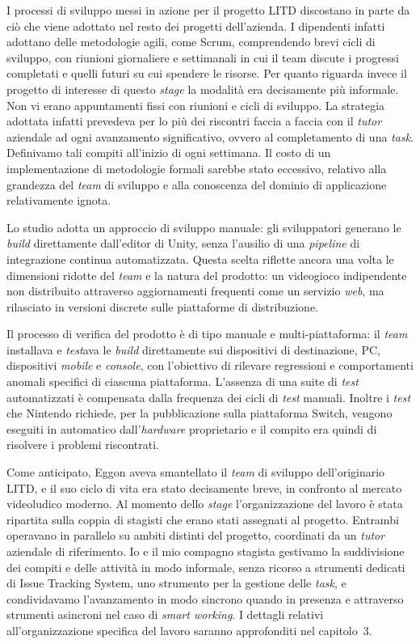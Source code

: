 I processi di sviluppo messi in azione per il progetto LITD discostano in parte da ciò che viene adottato nel resto dei progetti dell'azienda. I dipendenti infatti adottano delle metodologie agili, come Scrum, comprendendo brevi cicli di sviluppo, con riunioni giornaliere e settimanali in cui il team discute i progressi completati e quelli futuri su cui spendere le risorse. Per quanto riguarda invece il progetto di interesse di questo \textit{stage} la modalità era decisamente più informale. Non vi erano appuntamenti fissi con riunioni e cicli di sviluppo. La strategia adottata infatti prevedeva per lo più dei riscontri faccia a faccia con il \textit{tutor} aziendale ad ogni avanzamento significativo, ovvero al completamento di una \textit{task}. Definivamo tali compiti all'inizio di ogni settimana. Il costo di un implementazione di metodologie formali sarebbe stato eccessivo, relativo alla grandezza del \textit{team} di sviluppo e alla conoscenza del dominio di applicazione relativamente ignota.

Lo studio adotta un approccio di sviluppo manuale: gli sviluppatori generano le \textit{build} direttamente dall'editor di Unity, senza l'ausilio di una \textit{pipeline} di integrazione continua automatizzata. Questa scelta riflette ancora una volta le dimensioni ridotte del \textit{team} e la natura del prodotto: un videogioco indipendente non distribuito attraverso aggiornamenti frequenti come un servizio \textit{web}, ma rilasciato in versioni discrete sulle piattaforme di distribuzione.

Il processo di verifica del prodotto è di tipo manuale e multi-piattaforma: il \textit{team} installava e \textit{test}ava le \textit{build} direttamente sui dispositivi di destinazione, PC, dispositivi \textit{mobile} e \textit{console}, con l'obiettivo di rilevare regressioni e comportamenti anomali specifici di ciascuna piattaforma. L'assenza di una suite di \textit{test} automatizzati è compensata dalla frequenza dei cicli di \textit{test} manuali. Inoltre i \textit{test} che Nintendo richiede, per la pubblicazione sulla piattaforma Switch, vengono eseguiti in automatico dall'\textit{hardware} proprietario e il compito era quindi di risolvere i problemi riscontrati.

Come anticipato, Eggon aveva smantellato il \textit{team} di sviluppo dell'originario LITD, e il suo ciclo di vita era stato decisamente breve, in confronto al mercato videoludico moderno. Al momento dello \textit{stage} l'organizzazione del lavoro è stata ripartita sulla coppia di stagisti che erano stati assegnati al progetto. Entrambi operavano in parallelo su ambiti distinti del progetto, coordinati da un \textit{tutor} aziendale di riferimento. Io e il mio compagno stagista gestivamo la suddivisione dei compiti e delle attività in modo informale, senza ricorso a strumenti dedicati di \gls{Issue Tracking System}, uno strumento per la gestione delle \textit{task}, e condividavamo l'avanzamento in modo sincrono quando in presenza e attraverso strumenti asincroni nel caso di \textit{smart working}. I dettagli relativi all'organizzazione specifica del lavoro saranno approfonditi nel capitolo~3.

